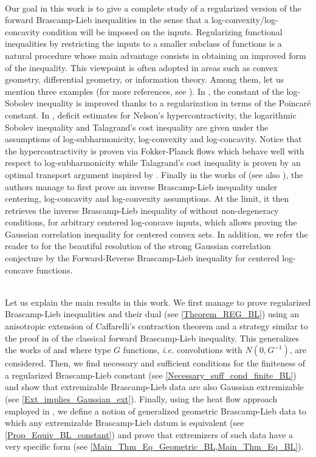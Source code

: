 \documentclass[11pt,a4paper,reqno]{amsart}
\numberwithin{equation}{section}
\theoremstyle{definition}
\newcommand{\<}{\ensuremath \leq}
\renewcommand{\>}{\ensuremath \geq}
\begin{document}
\hfill \\ Our goal in this work is to give a complete study of a regularized version of the forward Brascamp-Lieb inequalities in the sense that a log-convexity/log-concavity condition will be imposed on the inputs. Regularizing functional inequalities by restricting the inputs to a smaller subclass of functions is a natural procedure whose main advantage consists in obtaining an improved form of the inequality. This viewpoint is often adopted in areas such as convex geometry, differential geometry, or information theory. Among them, let us mention three examples (for more references, see \cite{Nakamura}). In \cite{Fathi}, the constant of the log-Sobolev inequality is improved thanks to a regularization in terms of the Poincaré constant. In \cite{Nakamura_Tsuji}, deficit estimates for Nelson's hypercontractivity, the logarithmic Sobolev inequality and Talagrand's cost inequality are given under the assumptions of log-subharmonicity, log-convexity and log-concavity. Notice that the hypercontractivity is proven via Fokker-Planck flows which behave well with respect to log-subharmonicity while Talagrand's cost inequality is proven by an optimal transport argument inspired by \cite{Cordero}. 
Finally in the works of \cite{Shohei1,Shohei2} (see also \cite{Cordero_Fradelizi,Milman,Shohei3}), the authors manage to first prove an inverse Brascamp-Lieb inequality under centering, log-concavity and log-convexity assumptions. At the limit, it then retrieves the inverse Brascamp-Lieb inequality of \cite{Barthe_Wolff} without non-degeneracy conditions, for arbitrary centered log-concave inputs, which allows proving the Gaussian correlation inequality for centered convex sets. In addition, we refer the reader to \cite{Strong_Gaussian_Correlation} for the beautiful resolution of the strong Gaussian correlation conjecture by the Forward-Reverse Brascamp-Lieb inequality for centered log-concave functions. 

\hfill \\


Let us explain the main results in this work. We first manage to prove regularized Brascamp-Lieb inequalities and their dual (see \cref{Theorem_REG_BL}) using an anisotropic extension of Caffarelli's contraction theorem and a strategy similar to the proof in \cite{Barthe} of the classical forward Brascamp-Lieb inequality. 
This generalizes the works of \cite{Vald1} and \cite{BCCT} where type $G$ functions, \textit{i.e.} convolutions with $N(0,G^{-1})$, are considered. 
Then, we find necessary and sufficient conditions for the finiteness of a regularized Brascamp-Lieb constant (see \cref{Necessary_suff_cond_finite_BL}) and show that extremizable Brascamp-Lieb data are also Gaussian extremizable (see \cref{Ext_implies_Gaussian_ext}). Finally, using the heat flow approach employed in \cite{BCCT}, we define a notion of generalized geometric Brascamp-Lieb data to which any extremizable Brascamp-Lieb datum is equivalent (see \cref{Prop_Equiv_BL_constant}) and prove that extremizers of such data have a very specific form (see \cref{Main_Thm_Eq_Geometric_BL,Main_Thm_Eq_BL}).
\end{document}
